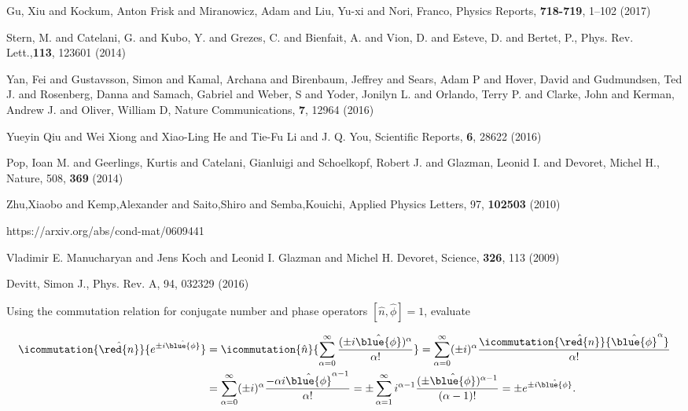\begin{thebibliography}{99}
Gu, Xiu and Kockum, Anton Frisk and Miranowicz, Adam and Liu, Yu-xi and Nori, Franco, Physics Reports, \textbf{718-719}, 1--102 (2017)

Stern, M. and Catelani, G. and Kubo, Y. and Grezes, C. and Bienfait, A. and Vion, D. and Esteve, D. and Bertet, P., Phys. Rev. Lett.,\textbf{113}, 123601 (2014)

Yan, Fei and Gustavsson, Simon and Kamal, Archana and Birenbaum, Jeffrey and Sears, Adam P and Hover, David and Gudmundsen, Ted J. and Rosenberg, Danna and Samach, Gabriel and Weber, S and Yoder, Jonilyn L. and Orlando, Terry P. and Clarke, John and Kerman, Andrew J. and Oliver, William D, Nature Communications, \textbf{7}, 12964 (2016)

Yueyin Qiu and Wei Xiong and Xiao-Ling He and Tie-Fu Li and J. Q. You, Scientific Reports, \textbf{6}, 28622 (2016)	

Pop, Ioan M. and Geerlings, Kurtis and Catelani, Gianluigi and Schoelkopf, Robert J. and Glazman, Leonid I. and Devoret, Michel H., Nature, 508, \textbf{369} (2014)


Zhu,Xiaobo and Kemp,Alexander and Saito,Shiro and Semba,Kouichi, Applied Physics Letters, 97, \textbf{102503} (2010)




https://arxiv.org/abs/cond-mat/0609441

{Vladimir E. Manucharyan and Jens Koch and Leonid I. Glazman and Michel H. Devoret}, {Science}, \textbf{326}, 113 (2009)

Devitt, Simon J., Phys. Rev. A, {94}, {032329} (2016)

 Using the commutation relation for conjugate number and phase operators $ \left[\hat{n},\hat{\phi}\right] = 1 $, evaluate
 
{\scriptsize\begin{equation}\label{key}
 \begin{aligned}
 \icommutation{\hat{\red{n}}}{e^{\pm i \hat{\blue{\phi}}}} & =  \icommutation{\hat{n}}{\sum_{\alpha = 0}^{\infty} \frac{(\pm i\hat{\blue{\phi}})^\alpha}{\alpha!}} = \sum_{\alpha = 0}^{\infty} (\pm i)^\alpha\frac{\icommutation{\hat{\red{n}}}{\hat{\blue{\phi}}^\alpha}}{\alpha!}\\
 & = \sum_{\alpha = 0}^{\infty} (\pm i)^\alpha\frac{-\alpha i\hat{\blue{\phi}}^{\alpha - 1}}{\alpha!} = 
 \pm \sum_{\alpha = 1}^{\infty}i^{\alpha - 1}\frac{(\pm\hat{\blue{\phi}})^{\alpha - 1}}{(\alpha - 1)!} =
 \pm e^{\pm i\hat{\blue{\phi}}}.
 \end{aligned}
\end{equation}}
 

\end{thebibliography}
